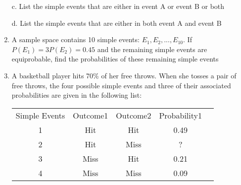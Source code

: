 \documentclass{article}
\begin{document}
\begin{enumerate}
    c. List the simple events that are either in event A or event B or both

    d. List the simple events that are either in both event A and event B
    
    \item A sample space contains 10 simple events: $E_1, E_2,...,E_10$. If $P(E_1) = 3P(E_2) = 0.45$ and the remaining simple events are equiprobable, find the probabilities of these remaining simple events
    \item A basketball player hits 70\% of her free throws. When she tosses a pair of free throws, the four possible simple events and three of their associated probabilities are given in the following list:
    
    \begin{center}
    \begin{tabular}{|c|c|c|c|c|}
        \hline
        Simple Events & Outcome1 & Outcome2 & Probability1 \\
        1 & Hit & Hit & 0.49 \\
        2 & Hit & Miss & ? \\
        3 & Miss & Hit & 0.21 \\
        4 & Miss & Miss & 0.09 \\
        \hline
    \end{tabular}
\end{center}
\end{enumerate}
\end{document}
